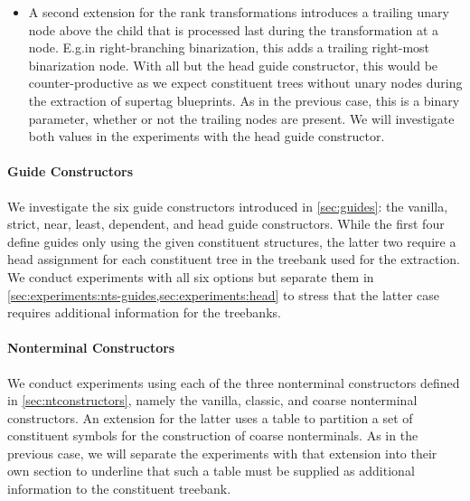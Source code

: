 \documentclass[../../document.tex]{subfiles}
\begin{document}
\begin{itemize}
        \item A second extension for the rank transformations introduces a trailing unary node above the child that is processed last during the transformation at a node. E.g.\@ in right-branching binarization, this adds a trailing right-most binarization node. With all but the head guide constructor, this would be counter-productive as we expect constituent trees without unary nodes during the extraction of supertag blueprints. As in the previous case, this is a binary parameter, whether or not the trailing nodes are present. We will investigate both values in the experiments with the head guide constructor.
    \end{itemize}

    \paragraph*{Guide Constructors}
    We investigate the six guide constructors introduced in \cref{sec:guides}: the vanilla, strict, near, least, dependent, and head guide constructors.
    While the first four define guides only using the given constituent structures, the latter two require a head assignment for each constituent tree in the treebank used for the extraction.
    We conduct experiments with all six options but separate them in \cref{sec:experiments:nts-guides,sec:experiments:head} to stress that the latter case requires additional information for the treebanks.

    \paragraph*{Nonterminal Constructors}
    We conduct experiments using each of the three nonterminal constructors defined in \cref{sec:ntconstructors}, namely the vanilla, classic, and coarse nonterminal constructors.
    An extension for the latter uses a table to partition a set of constituent symbols for the construction of coarse nonterminals.
    As in the previous case, we will separate the experiments with that extension into their own section to underline that such a table must be supplied as additional information to the constituent treebank.
\end{document}
